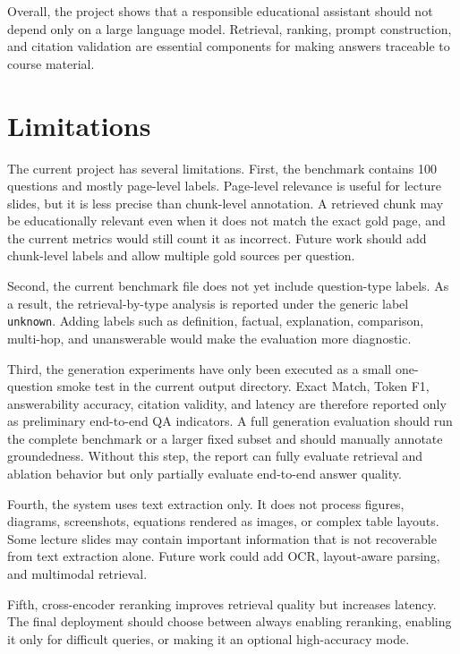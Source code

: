 \documentclass[11pt,a4paper]{article}
\begin{document}
Overall, the project shows that a responsible educational assistant should not
depend only on a large language model. Retrieval, ranking, prompt construction,
and citation validation are essential components for making answers traceable
to course material.

\section{Limitations}

The current project has several limitations. First, the benchmark contains 100
questions and mostly page-level labels. Page-level relevance is useful for
lecture slides, but it is less precise than chunk-level annotation. A retrieved
chunk may be educationally relevant even when it does not match the exact gold
page, and the current metrics would still count it as incorrect. Future work
should add chunk-level labels and allow multiple gold sources per question.

Second, the current benchmark file does not yet include question-type labels.
As a result, the retrieval-by-type analysis is reported under the generic label
\texttt{unknown}. Adding labels such as definition, factual, explanation,
comparison, multi-hop, and unanswerable would make the evaluation more
diagnostic.

Third, the generation experiments have only been executed as a small one-question
smoke test in the current output directory. Exact Match, Token F1,
answerability accuracy, citation validity, and latency are therefore reported
only as preliminary end-to-end QA indicators. A full generation evaluation should
run the complete benchmark or a larger fixed subset and should manually annotate
groundedness. Without this step, the report can fully evaluate retrieval and
ablation behavior but only partially evaluate end-to-end answer quality.

Fourth, the system uses text extraction only. It does not process figures,
diagrams, screenshots, equations rendered as images, or complex table layouts.
Some lecture slides may contain important information that is not recoverable
from text extraction alone. Future work could add OCR, layout-aware parsing, and
multimodal retrieval.

Fifth, cross-encoder reranking improves retrieval quality but increases latency.
The final deployment should choose between always enabling reranking, enabling
it only for difficult queries, or making it an optional high-accuracy mode.
\end{document}
